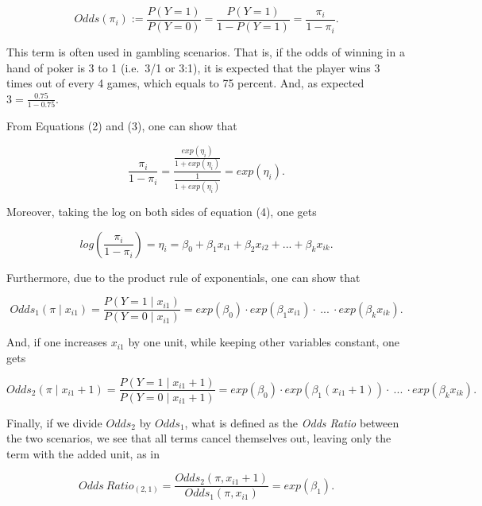 \documentclass[12,]{article}
\begin{document}
\begin{equation}
Odds(\pi_i) :=  \frac{P(Y = 1)}{P(Y = 0)} = \frac{P(Y = 1)}{1 - P(Y = 1)} = \frac{\pi_i}{1 - \pi_i}.
\end{equation}

This term is often used in gambling scenarios. That is, if the odds of
winning in a hand of poker is 3 to 1 (i.e.~3/1 or 3:1), it is expected
that the player wins 3 times out of every 4 games, which equals to 75
percent. And, as expected \(3 = \frac{0.75}{1 - 0.75}\).

From Equations (2) and (3), one can show that

\begin{equation}
\frac{\pi_i}{1 - \pi_i} = 
      \frac{\frac{exp(\eta_i)}{1 + exp(\eta_i)} }  {\frac{1}{1 + exp(\eta_i)}} =
      exp(\eta_i).
\end{equation}

Moreover, taking the log on both sides of equation (4), one gets

\begin{equation}
log \left(  \frac{\pi_i}{1 - \pi_i}  \right) = \eta_i = \beta_0 + \beta_1 x_{i1} + \beta_2 x_{i2} + ... + \beta_k x_{ik}. 
\end{equation}

Furthermore, due to the product rule of exponentials, one can show that

\begin{equation}
Odds_1(\pi \mid x_{i1}) = \frac{P(Y = 1 \mid x_{i1})}{P(Y = 0 \mid x_{i1})} = 
              exp(\beta_0) \cdot exp(\beta_1 x_{i1}) \cdot~...~\cdot exp(\beta_k x_{ik}).
\end{equation}

And, if one increases \(x_{i1}\) by one unit, while keeping other
variables constant, one gets

\begin{equation}
Odds_2(\pi \mid x_{i1} + 1) = \frac{P(Y = 1 \mid x_{i1} + 1)}{P(Y = 0 \mid x_{i1} + 1)} = 
              exp(\beta_0) \cdot exp(\beta_1 (x_{i1} + 1)) \cdot~...~\cdot exp(\beta_k x_{ik}). 
\end{equation}

Finally, if we divide \(Odds_2\) by \(Odds_1\), what is defined as the
\emph{Odds Ratio} between the two scenarios, we see that all terms
cancel themselves out, leaving only the term with the added unit, as in

\begin{equation}
Odds~Ratio_{(2, 1)} = \frac {Odds_2(\pi, x_{i1} + 1)} {Odds_1(\pi, x_{i1})} = exp(\beta_1).
\end{equation}
\end{document}
